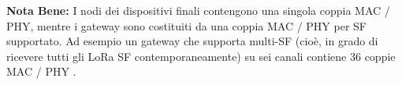 \documentclass[a4paper]{report} %
\begin{document}

\textbf{Nota Bene:} I nodi dei dispositivi finali contengono una singola coppia MAC / PHY, mentre i gateway sono costituiti da una coppia MAC / PHY per SF supportato. Ad esempio un gateway che supporta multi-SF (cioè, in grado di ricevere tutti gli LoRa SF contemporaneamente) su sei canali contiene 36 coppie MAC / PHY \cite{art:rif.49}.
\end{document}

